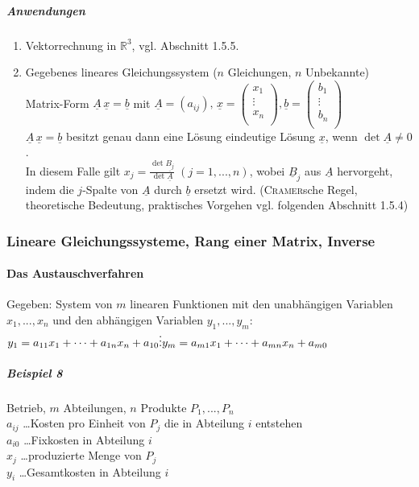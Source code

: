 \documentclass[a4paper]{scrartcl}
\begin{document}
\subparagraph{Anwendungen}
\begin{enumerate}
\item Vektorrechnung in $\mathbb{R}^3$, vgl. Abschnitt 1.5.5.
\item Gegebenes lineares Gleichungssystem ($n$ Gleichungen, $n$ Unbekannte)\\
Matrix-Form $\underline{A}\, \underline{x} = \underline{b}$ mit $\underline{A} = (a_{ij}), \, \underline{x} = \begin{pmatrix} x_1 \\ \vdots \\ x_n\\ \end{pmatrix}, \underline{b}= \begin{pmatrix} b_1 \\ \vdots \\ b_n\\ \end{pmatrix}$\\
$\underline{A}\, \underline{x} = \underline{b}$ besitzt genau dann eine Lösung eindeutige Lösung $\underline{x}$, wenn $\det{\underline{A}} \neq 0$.\\
In diesem Falle gilt $x_j = \frac{\det{\underline{B_j}}}{\det{\underline{A}}} \; (j=1, ... ,n)$, wobei $\underline{B}_j$ aus $\underline{A}$ hervorgeht, indem die $j$-Spalte von $\underline{A}$ durch $\underline{b}$ ersetzt wird. (\textsc{Cramer}sche Regel, theoretische Bedeutung, praktisches Vorgehen vgl. folgenden Abschnitt 1.5.4)

\end{enumerate}

\subsubsection{Lineare Gleichungssysteme, Rang einer Matrix, Inverse}
\paragraph{Das Austauschverfahren}
Gegeben: System von $m$ linearen Funktionen mit den unabhängigen Variablen $x_1,...,x_n$ und den abhängigen Variablen $y_1,...,y_m$:\\
$y_1 = a_{11} x_1 + \dots + a_{1n} x_n + a_{10}\\
\vdots\\
y_m = a_{m1} x_1 + \dots + a_{mn} x_n + a_{m0}$

\subparagraph{Beispiel 8} Betrieb, $m$ Abteilungen, $n$ Produkte $P_1,...,P_n$\\
$a_{ij}$ \dots Kosten pro Einheit von $P_j$ die in Abteilung $i$ entstehen\\
$a_{i0}$ \dots Fixkosten in Abteilung $i$\\
$x_j$ \dots produzierte Menge von $P_j$\\
$y_i$ \dots Gesamtkosten in Abteilung $i$\\
\end{document}
